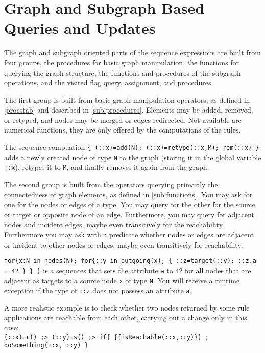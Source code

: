 \section{Graph and Subgraph Based Queries and Updates}\label{sec:queryupdate}\label{sec:visited}

The graph and subgraph oriented parts of the sequence expressions are built from four groups,
the procedures for basic graph manipulation, the functions for querying the graph structure, the functions and procedures of the subgraph operations, and the visited flag query, assignment, and procedures.

The first group is built from basic graph manipulation operators, as defined in \ref{procstab} and described in \ref{sub:procedures}.
Elements may be added, removed, or retyped, and nodes may be merged or edges redirected.
Not available are numerical functions, they are only offered by the computations of the rules. 

\begin{example}
The sequence compuation \verb#{ (::x)=add(N); (::x)=retype(::x,M); rem(::x) }# adds a newly created node of type \texttt{N} to the graph (storing it in the global variable \verb#::x#), retypes it to \texttt{M}, and finally removes it again from the graph.
\end{example}

The second group is built from the operators querying primarily the connectedness of graph elements,
as defined in \ref{sub:functions}.
You may ask for one for the nodes or edges of a type.
You may query for the other for the source or target or opposite node of an edge.
Furthermore, you may query for adjacent nodes and incident edges,
maybe even transitively for the reachability.
Furthermore you may ask with a predicate whether nodes or edges are adjacent or incident to other nodes or edges, maybe even transitively for reachability.

\begin{example}
\verb#for{x:N in nodes(N); for{::y in outgoing(x); { ::z=target(::y); ::z.a = 42 } } }# 
is a sequences that sets the attribute \texttt{a} to 42 for all nodes that are adjacent as targets to a source node \texttt{x} of type \texttt{N}.
You will receive a runtime exception if the type of \verb#::z# does not possess an attribute \texttt{a}.

A more realistic example is to check whether two nodes returned by some rule applications are reachable from each other, carrying out a change only in this case:\\
\verb#(::x)=r() ;> (::y)=s() ;> if{ {{isReachable(::x,::y)}} ; doSomething(::x, ::y) }#
\end{example}

